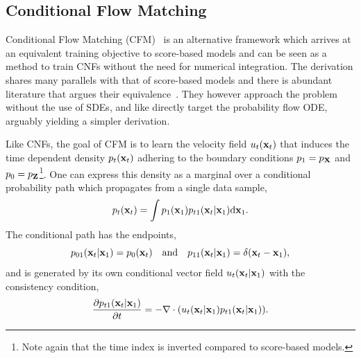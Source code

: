 \subsection{Conditional Flow Matching}

Conditional Flow Matching (CFM)~\cite{BuildingNormalizingFlows, FlowMatchingGenerative, FlowStraightFast} is an alternative framework which arrives at an equivalent training objective to score-based models and can be seen as a method to train CNFs without the need for numerical integration.
The derivation shares many parallels with that of score-based models and there is abundant literature that argues their equivalence~\cite{CM2, StochasticInterpolants}.
They however approach the problem without the use of SDEs, and like \textcite{ElucidatingDesignSpace} directly target the probability flow ODE, arguably yielding a simpler derivation.

Like CNFs, the goal of CFM is to learn the velocity field $u_t(\mathbf{x}_t)$ that induces the time dependent density $p_t(\mathbf{x}_t)$ adhering to the boundary conditions $p_1 = p_{\mathbf{X}}$ and $p_0 = p_{\mathbf{Z}}$\footnote{Note again that the time index is inverted compared to score-based models.}.
One can express this density as a marginal over a conditional probability path which propagates from a single data sample,
\begin{equation}
    \label{eq:conditional_path}
    p_t(\mathbf{x}_t) = \int p_1(\mathbf{x}_1) p_{t1}(\mathbf{x}_t|\mathbf{x}_1) \mathrm{d} \mathbf{x}_1.
\end{equation}
The conditional path has the endpoints,
\begin{equation}
    \label{eq:conditional_path_endpoints}
    p_{01}(\mathbf{x}_t|\mathbf{x}_1) = p_0(\mathbf{x}_t) \quad \text{and} \quad p_{11}(\mathbf{x}_t|\mathbf{x}_1) = \delta(\mathbf{x}_t - \mathbf{x}_1),
\end{equation}
and is generated by its own conditional vector field $u_t(\mathbf{x}_t | \mathbf{x}_1)$ with the consistency condition,
\begin{equation}
    \label{eq:conditional_consistency}
    \frac{\partial p_{t1}(\mathbf{x}_t | \mathbf{x}_1)}{\partial t} = -\nabla \cdot (u_t(\mathbf{x}_t | \mathbf{x}_1) p_{t1}(\mathbf{x}_t | \mathbf{x}_1)).
\end{equation}

